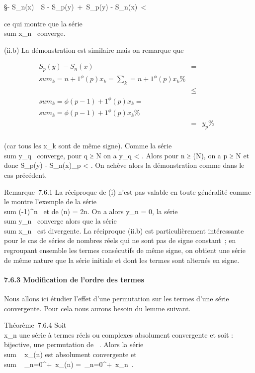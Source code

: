 \documentclass[]{article}
\begin{document}
\S - S_n(x)\
\leq\ S -
S_p(y)\ +\
S_p(y) - S_n(x)\ <
\epsilon

ce qui montre que la série
\\sum  x_n~
converge.

(ii.b) La démonstration est similaire mais on remarque que

\begin{align*} S_p(y) -
S_n(x)& =& \\sum
_k=n+1^\phi(p)x_ k =
\sum _k=n+1^\phi(p)x_
k \%& \\ & \leq&
\\sum
_k=\phi(p-1)+1^\phi(p)x_ k =
\\sum
_k=\phi(p-1)+1^\phi(p)x_ k\%&
\\ & =& y_p
\%& \\ \end{align*}

(car tous les x_k sont de même signe). Comme la série
\\sum  y_q~
converge, pour q ≥ N on a y_q <
\epsilon {} . Alors pour n ≥ \phi(N), on a p ≥ N et donc
S_p(y) -
S_n(x)\leqy_p <
\epsilon {} . On achève alors la démonstration comme dans
le cas précédent.

Remarque~7.6.1 La réciproque de (i) n'est pas valable en toute
généralité comme le montre l'exemple de la série
\\sum  (-1)^n~
et de \phi(n) = 2n. On a alors y_n = 0, la série
\\sum  y_n~
converge alors que la série
\\sum  x_n~ est
divergente. La réciproque (ii.b) est particulièrement intéressante pour
le cas de séries de nombres réels qui ne sont pas de signe constant~; en
regroupant ensemble les termes consécutifs de même signe, on obtient une
série de même nature que la série initiale et dont les termes sont
alternés en signe.

\paragraph{7.6.3 Modification de l'ordre des termes}

Nous allons ici étudier l'effet d'une permutation sur les termes d'une
série convergente. Pour cela nous aurons besoin du lemme suivant.

Théorème~7.6.4 Soit \\\sum
 x_n une série à termes réels ou complexes absolument
convergente et soit \sigma : ~ \rightarrow~ ~ bijective, une permutation de ~. Alors la
série \\sum ~
x_\sigma(n) est absolument convergente et
\\sum ~
_n=0^+\infty~x_\sigma(n) =\
\sum  _n=0^+\infty~x_n~.
\end{document}
